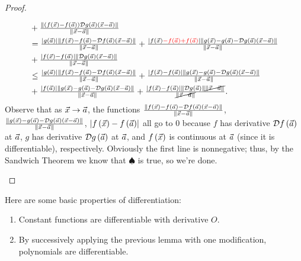 \documentclass[main.tex]{subfiles}
\begin{document}
\begin{proof}
\begin{enumerate}
\begin{align*}
            &+ \tfrac{\norm{\parens{f\parens{\vx} - f\parens{\va}}\mathcal{D}g\parens{\va}\parens{\vx - \va}}}{\norm{\vx - \va}} \\
            &= \tfrac{\abs{g\parens{\va}}\norm{f\parens{\vx} - f\parens{\va} - \mathcal{D}f\parens{\va}\parens{\vx - \va}}}{\norm{\vx - \va}} + \tfrac{\abs{f\parens{\vx} \begingroup\color{red} - f\parens{\va} + f\parens{\va}\endgroup}\norm{g\parens{\vx} - g\parens{\va} - \mathcal{D}g\parens{\va}\parens{\vx - \va}}}{\norm{\vx - \va}} \\
            &+ \tfrac{\abs{f\parens{\vx} - f\parens{\va}}\norm{\mathcal{D}g\parens{\va}\parens{\vx - \va}}}{\norm{\vx - \va}} \\
            &\le \tfrac{\abs{g\parens{\va}}\norm{f\parens{\vx} - f\parens{\va} - \mathcal{D}f\parens{\va}\parens{\vx - \va}}}{\norm{\vx - \va}} + \tfrac{\abs{f\parens{\vx} - f\parens{\va}}\norm{g\parens{\vx} - g\parens{\va} - \mathcal{D}g\parens{\va}\parens{\vx - \va}}}{\norm{\vx - \va}} \\
            &+ \tfrac{\abs{f\parens{\va}}\norm{g\parens{\vx} - g\parens{\va} - \mathcal{D}g\parens{\va}\parens{\vx - \va}}}{\norm{\vx - \va}} + \tfrac{\abs{f\parens{\vx} - f\parens{\va}}\norm{\mathcal{D}g\parens{\va}}\cancel{\norm{\vx - \va}}}{\cancel{\norm{\vx - \va}}}.
        \end{align*}
        Observe that as $\vec{x}\to \vec{a}$, the functions $\tfrac{\left\lVert f\left( \vec{x} \right) - f\left( \vec{a} \right) - \mathcal{D}f\left( \vec{a} \right)\left( \vec{x} - \vec{a} \right) \right\rVert}{\left\lVert \vec{x} - \vec{a} \right\rVert}$, $\tfrac{\left\lVert g\left( \vec{x} \right) - g\left( \vec{a} \right) - \mathcal{D}g\left( \vec{a} \right)\left( \vec{x} - \vec{a} \right) \right\rVert}{\left\lVert \vec{x} - \vec{a} \right\rVert}$, $\left\lvert f\left( \vec{x} \right) - f\left( \vec{a} \right) \right\rvert$ all go to $0$ because $f$ has derivative $\mathcal{D}f\left( \vec{a} \right)$ at $\vec{a}$, $g$ has derivative $\mathcal{D}g\left( \vec{a} \right)$ at $\vec{a}$, and $f\left( \vec{x} \right)$ is continuous at $\vec{a}$ (since it is differentiable), respectively. Obviously the first line is nonnegative; thus, by the Sandwich Theorem we know that $\spadesuit$ is true, so we're done.\qedhere
    \end{enumerate}
\end{proof}

Here are some basic properties of differentiation:
\begin{enumerate}
    \item Constant functions are differentiable with derivative $O$.
    \item By successively applying the previous lemma with one modification, polynomials are differentiable.
\end{enumerate}
\end{document}
